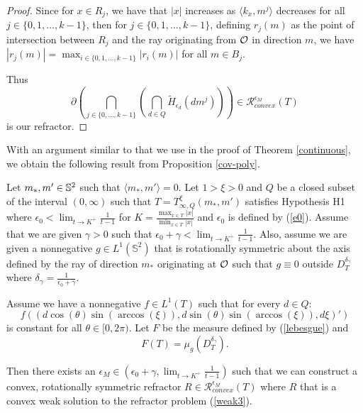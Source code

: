 \documentclass[review]{elsarticle}
\begin{document}
\begin{proof}
    Since for $x\in R_j$, we have that $|x|$ increases as $\langle k_x,m^j\rangle$ decreases for all $j\in \{0,1,\dots,k-1\}$, then for $j\in \{0,1,\dots,k-1\}$, defining $r_j(m)$ as the point of intersection between $R_j$ and the ray originating from $\mathcal{O}$ in direction $m$, we have $|r_j(m)|=\max_{i\in \{0,1,\dots,k-1\}}|r_i(m)|$ for all $m\in B_j$.

Thus
\begin{equation}
    \partial\left(\bigcap_{j\in\{0,\dots,k-1\}}\left(\bigcap_{d\in Q} \tilde{H}_{\epsilon_d}(dm^j)\right)\right) \in\mathcal{R}_{convex}^{\epsilon_M} (T)
\end{equation}
is our refractor. 
\end{proof}

With an argument similar to that we use in the proof of Theorem \ref{continuous}, we obtain the following result from Proposition \ref{cov-poly}. 

\begin{theorem}\label{cov-rot}
    Let $m_*,m'\in \mathbb{S}^2$ such that $\langle m_*,m'\rangle=0$. Let $1>\xi>0$ and $Q$ be a closed subset of the interval $(0,\infty)$ such that $T=T_{\infty,Q}^\xi(m_*,m')$ satisfies Hypothesis H1 where $\epsilon_0<\lim_{t\to K^+}\frac{1}{t-1}$ for $K=\frac{\max_{x\in T} |x|}{\min_{x\in T} |x|}$ and $\epsilon_0$ is defined by (\ref{e0}). Assume that we are given $\gamma>0$ such that $\epsilon_0+\gamma<\lim_{t\to K^+}\frac{1}{t-1}$. Also, assume we are given a nonnegative $g\in L^1(\mathbb{S}^2)$ that is rotationally symmetric about the axis defined by the ray of direction $m_*$ originating at $\mathcal{O}$ such that $g\equiv 0$ outside $D_T^{\delta_\gamma}$ where $\delta_\gamma=\frac1{\epsilon_0+\gamma}$. 
    
   Assume we have a nonnegative $f\in L^1(T)$ such that for every $d\in Q$:
    \begin{equation}
f\left(\left(d\cos\left(\theta\right)\sin\left(\arccos(\xi)\right),d\sin\left(\theta\right)\sin\left(\arccos(\xi)\right),d\xi\right)'\right)
    \end{equation}
    is constant for all $\theta\in [0,2\pi)$. Let $F$ be the measure defined by (\ref{lebesgue}) and
    \begin{equation}
    F(T) = \mu_{g}(D_T^{\delta_\gamma}).
\end{equation}

Then there exists an $\epsilon_M\in(\epsilon_0+\gamma,\lim_{t\to K^+}\frac{1}{t-1})$ such that we can construct a convex, rotationally symmetric refractor $R  \in \mathcal{R}_{convex}^{\epsilon_M} (T)$ where $R$ that is a convex weak solution to the refractor problem (\ref{weak3}).    
\end{theorem}
\end{document}
